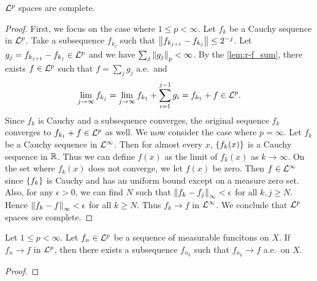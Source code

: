 \begin{theorem}
    $\mathcal{L}^p$ spaces are complete. 
\end{theorem}
\begin{proof}
    First, we focus on the case where $1\leq p<\infty$. Let $f_k$ be a 
    Cauchy sequence in $\mathcal{L}^p$. Take a subsequence $f_{k_j}$ such that 
    $\left\lVert {f_{k_{j+1}}-f_{k_j}} \right\rVert \leq 2^{-j}$. Let 
    $g_j = f_{k_{j+1}}-f_{k_j}\in\mathcal{L}^p$ and we have 
    $\sum_j \left\lVert {g_j} \right\rVert_p < \infty$. By the \cref{lem:r-f_sum}, there exists 
    $f\in\mathcal{L}^p$ such that $f = \sum_j g_j$ a.e.\ and 
    \begin{equation*}
        \lim_{j\to\infty} f_{k_j} = \lim_{j\to\infty} f_{k_1} + \sum_{i=1}^{j-1} g_i 
        = f_{k_1} + f\in\mathcal{L}^p.
    \end{equation*}
    Since $f_k$ is Cauchy and a subsequence converges, the original 
    sequence $f_k$ converges to $f_{k_1} + f\in\mathcal{L}^p$ as well. 
    We now consider the case where $p=\infty$. Let $f_k$ be a Cauchy 
    sequence in $\mathcal{L}^\infty$. Then for almost every $x$, $\left\{ {f_k(x)} \right\}$ 
    is a Cauchy sequence in $\mathbb{R}$. Thus we can define $f(x)$ as the 
    limit of $f_k(x)$ as $k\to\infty$. On the set where $f_k(x)$ does 
    not converge, we let $f(x)$ be zero. Then $f\in\mathcal{L}^\infty$ since 
    $\left\{ {f_k} \right\}$ is Cauchy and has an uniform bound except on a measure 
    zero set. Also, for any $\epsilon>0$, we can find $N$ such that 
    $\left\lVert {f_k - f_j} \right\rVert_\infty < \epsilon$ for all $k,j\geq N$. Hence 
    $\left\lVert {f_k-f} \right\rVert_\infty < \epsilon$ for all $k\geq N$. Thus $f_k\to f$ 
    in $\mathcal{L}^\infty$. We conclude that $\mathcal{L}^p$ spaces are complete.
\end{proof}

\begin{theorem}\label{thm:Lp_subseq_ae}
    Let $1\leq p<\infty$. Let $f_n\in\mathcal{L}^p$ be a sequence of measurable 
    funcitons on $X$. If $f_n\to f$ in $\mathcal{L}^p$, then there exists a subsequence 
    $f_{n_k}$ such that $f_{n_k}\to f$ a.e.\ on $X$.
\end{theorem}
\begin{proof}
    
\end{proof}

